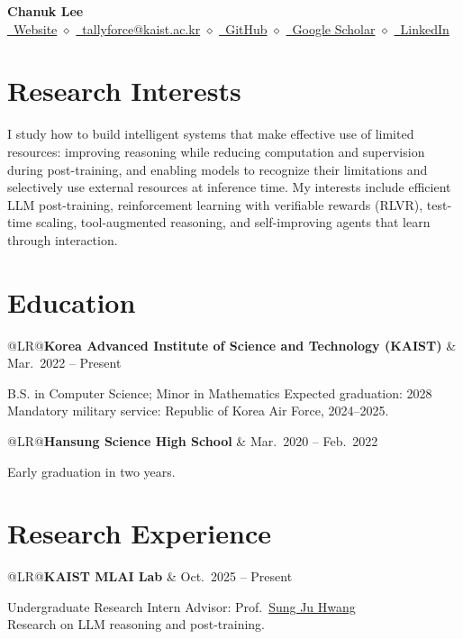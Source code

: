 \documentclass[a4paper,11pt]{article}
\makeatletter
\newcommand{\entry}[2]{%
  \begin{tabularx}{\linewidth}{@{}LR@{}}\textbf{#1} & #2\end{tabularx}%
}
\makeatother
\begin{document}
\begin{center}
  {\LARGE\bfseries Chanuk Lee}\\[6pt]
  \small
  \href{https://tally0818.github.io}{\faHome\ Website}
  \enspace$\diamond$\enspace
  \href{mailto:tallyforce@kaist.ac.kr}{\faEnvelope\ tallyforce@kaist.ac.kr}
  \enspace$\diamond$\enspace
  \href{https://github.com/tally0818}{\faGithub\ GitHub}
  \enspace$\diamond$\enspace
  \href{https://scholar.google.com/citations?user=bygrV1UAAAAJ\&hl=en}{\faGraduationCap\ Google Scholar}
  \enspace$\diamond$\enspace
  \href{https://www.linkedin.com/in/chanuk-lee-203554398}{\faLinkedin\ LinkedIn}
\end{center}
\vspace{-9pt}

\section{Research Interests}

I study how to build intelligent systems that make effective use of limited resources:
improving reasoning while reducing computation and supervision during post-training,
and enabling models to recognize their limitations and selectively use external resources
at inference time. My interests include efficient LLM post-training, reinforcement learning
with verifiable rewards (RLVR), test-time scaling, tool-augmented reasoning, and
self-improving agents that learn through interaction.

\section{Education}

\entry{Korea Advanced Institute of Science and Technology (KAIST)}{Mar.~2022 -- Present}
B.S. in Computer Science; Minor in Mathematics \hfill Expected graduation: 2028\\
{\small Mandatory military service: Republic of Korea Air Force, 2024--2025.}

\entry{Hansung Science High School}{Mar.~2020 -- Feb.~2022}
Early graduation in two years.

\section{Research Experience}

\entry{KAIST MLAI Lab}{Oct.~2025 -- Present}
Undergraduate Research Intern \hfill Advisor: Prof.~\href{http://www.sungjuhwang.com}{Sung Ju Hwang}\\
Research on LLM reasoning and post-training.
\end{document}
